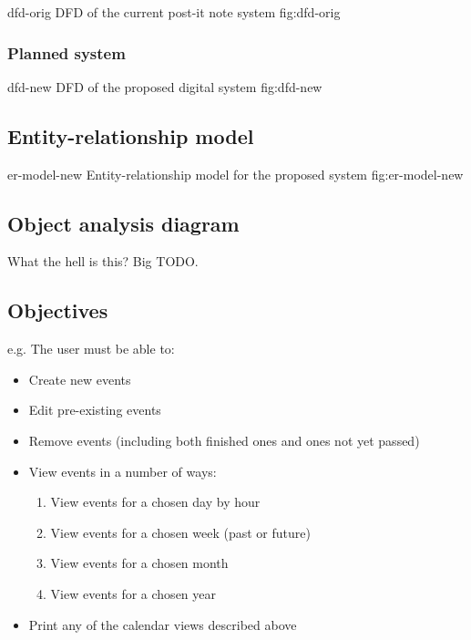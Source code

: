 \addfigure
    {dfd-orig}
    {DFD of the current post-it note system}
    {fig:dfd-orig}

\subsubsection{Planned system}

\addfigure
    {dfd-new}
    {DFD of the proposed digital system}
    {fig:dfd-new}

\subsection{Entity-relationship model}

\addfigure
    {er-model-new}
    {Entity-relationship model for the proposed system}
    {fig:er-model-new}

\subsection{Object analysis diagram}

What the hell is this? Big TODO.

\subsection{Objectives}


e.g. The user must be able to:

\begin{itemize}
  \item Create new events
  \item Edit pre-existing events
  \item Remove events (including both finished ones and ones not yet passed)
  \item View events in a number of ways:
      \begin{enumerate}
      \item View events for a chosen day by hour
      \item View events for a chosen week (past or future)
      \item View events for a chosen month
      \item View events for a chosen year
      \end{enumerate}
  \item Print any of the calendar views described above
\end{itemize}

